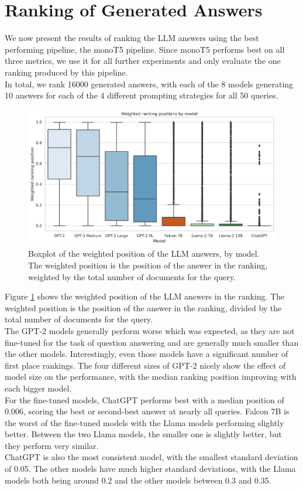 \section{Ranking of Generated Answers}
We now present the results of ranking the LLM answers using the best performing pipeline, the monoT5 pipeline.
Since monoT5 performs best on all three metrics, we use it for all further experiments and only evaluate the one ranking produced by this pipeline.
\\
In total, we rank 16000 generated answers, with each of the 8 models generating 10 answers for each of the 4 different prompting strategies for all 50 queries.
\begin{figure}
\centering
\includegraphics[width=\textwidth]{images/weighted_position_boxplot.png}
\caption{Boxplot of the weighted position of the LLM answers, by model. The weighted position is the position of the answer in the ranking, weighted by the total number of documents for the query.}
\label{fig:weighted_position_boxplot}
\end{figure}
Figure \ref{fig:weighted_position_boxplot} shows the weighted position of the LLM answers in the ranking.
The weighted position is the position of the answer in the ranking, divided by the total number of documents for the query.
\\
The GPT-2 models generally perform worse which was expected, as they are not fine-tuned for the task of question answering and are generally much smaller than the other models.
Interestingly, even those models have a significant number of first place rankings.
The four different sizes of GPT-2 nicely show the effect of model size on the performance, with the median ranking position improving with each bigger model.
\\
For the fine-tuned models, ChatGPT performs best with a median position of 0.006, scoring the best or second-best answer at nearly all queries.
Falcon 7B is the worst of the fine-tuned models with the Llama models performing slightly better.
Between the two Llama models, the smaller one is slightly better, but they perform very similar.
\\
ChatGPT is also the most consistent model, with the smallest standard deviation of 0.05.
The other models have much higher standard deviations, with the Llama models both being around 0.2 and the other models between 0.3 and 0.35.
\\

